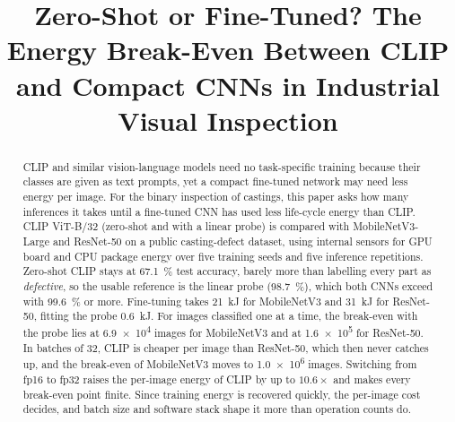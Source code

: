 \documentclass[conference]{IEEEtran}
\begin{document}
\title{Zero-Shot or Fine-Tuned? The Energy Break-Even Between CLIP and Compact CNNs in Industrial Visual Inspection}

\author{
\and
{}
\and
{}
}

\maketitle

\begin{abstract}
CLIP and similar vision-language models need no task-specific training because their classes are given
as text prompts, yet a compact fine-tuned network may need less energy per image. For the binary
inspection of castings, this paper asks how many inferences it takes until a fine-tuned CNN has used
less life-cycle energy than CLIP. CLIP ViT-B/32 (zero-shot and with a linear probe) is compared with
MobileNetV3-Large and ResNet-50 on a public casting-defect dataset, using internal sensors for GPU board and CPU package energy over five training seeds and five
inference repetitions. Zero-shot CLIP stays at \SI{67.1}{\percent} test accuracy, barely more than
labelling every part as \emph{defective}, so the usable reference is the linear probe
(\SI{98.7}{\percent}), which both CNNs exceed with \SI{99.6}{\percent} or more.
Fine-tuning takes \SI{21}{kJ} for MobileNetV3 and \SI{31}{kJ} for ResNet-50, fitting the probe
\SI{0.6}{kJ}. For images classified one at a time, the break-even with the probe lies at \num{6.9e4}
images for MobileNetV3 and at \num{1.6e5} for ResNet-50. In batches of 32, CLIP is cheaper per image than ResNet-50, which then never catches up, and the
break-even of MobileNetV3 moves to \num{1.0e6} images. Switching from fp16 to fp32 raises
the per-image energy of CLIP by up to $10.6\times$ and makes every break-even point finite. Since training energy is recovered quickly, the per-image cost decides, and batch size and software stack
shape it more than operation counts do.
\end{abstract}
\end{document}
